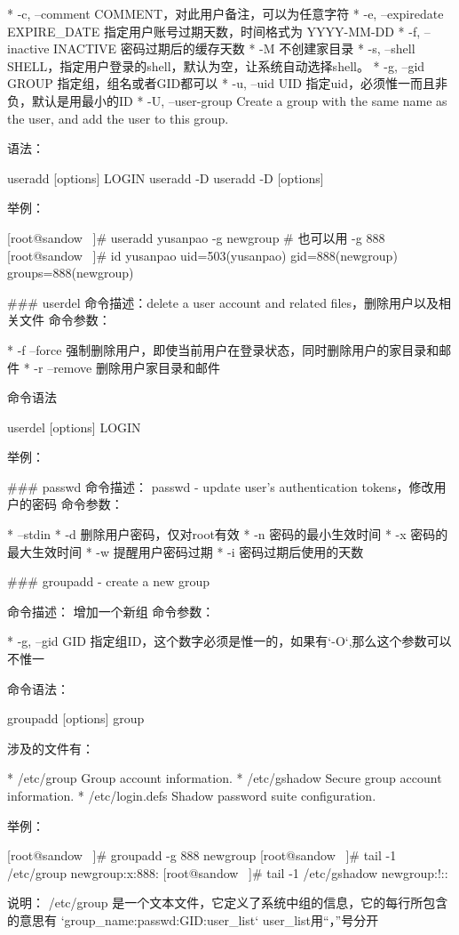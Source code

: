 * -c, --comment COMMENT，对此用户备注，可以为任意字符
* -e, --expiredate EXPIRE_DATE 指定用户账号过期天数，时间格式为 YYYY-MM-DD
* -f, --inactive INACTIVE 密码过期后的缓存天数
* -M 不创建家目录
* -s, --shell SHELL，指定用户登录的shell，默认为空，让系统自动选择shell。
* -g, --gid GROUP 指定组，组名或者GID都可以
* -u, --uid UID 指定uid，必须惟一而且非负，默认是用最小的ID
* -U, --user-group Create a group with the same name as the user, and add the user to this group.

语法：

       useradd [options] LOGIN
       useradd -D
       useradd -D [options]

举例：

    [root@sandow ~]# useradd yusanpao -g newgroup  # 也可以用 -g 888
    [root@sandow ~]# id yusanpao
    uid=503(yusanpao) gid=888(newgroup) groups=888(newgroup)


### userdel
命令描述：delete a user account and related files，删除用户以及相关文件
命令参数：

* -f --force 强制删除用户，即使当前用户在登录状态，同时删除用户的家目录和邮件
* -r --remove 删除用户家目录和邮件

命令语法

       userdel [options] LOGIN

举例：

### passwd
命令描述： passwd - update user’s authentication tokens，修改用户的密码
命令参数：

* --stdin
* -d 删除用户密码，仅对root有效
* -n 密码的最小生效时间
* -x 密码的最大生效时间
* -w 提醒用户密码过期
* -i 密码过期后使用的天数


### groupadd - create a new group

命令描述： 增加一个新组
命令参数：

* -g, --gid GID 指定组ID，这个数字必须是惟一的，如果有`-O`,那么这个参数可以不惟一

命令语法：

    groupadd [options] group

涉及的文件有：

* /etc/group  Group account information.
* /etc/gshadow Secure group account information.
* /etc/login.defs Shadow password suite configuration.

举例：

    [root@sandow ~]# groupadd -g 888 newgroup
    [root@sandow ~]# tail -1 /etc/group
    newgroup:x:888:
    [root@sandow ~]# tail -1 /etc/gshadow
    newgroup:!::

说明：
/etc/group 是一个文本文件，它定义了系统中组的信息，它的每行所包含的意思有 `group_name:passwd:GID:user_list`
user_list用“，”号分开

